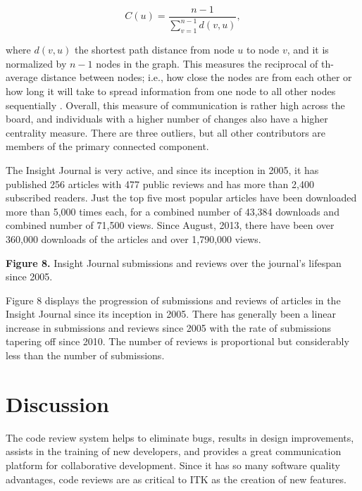 \documentclass{frontiersENG} %
\begin{document}
\begin{equation}
   C(u) = \frac{n - 1}{\sum_{v=1}^{n-1} d(v, u)},
\end{equation}

where $d(v, u)$ the shortest path distance from node $u$ to node $v$, and it
is normalized by $n-1$ nodes in the graph. This measures the reciprocal of th-
average distance between nodes; i.e., how close the nodes are from each other
or how long it will take to spread information from one node to all other
nodes sequentially \cite{Newman2005}. Overall, this measure of communication is
rather high across the board, and individuals with a higher
number of changes also have a higher centrality measure.  There are three
outliers, but all other contributors are members of the primary connected
component.


%
%
%
The Insight Journal is very active, and since its inception in 2005, it has published
256 articles with 477 public reviews and has more than 2,400 subscribed
readers. Just the top five most popular articles have been downloaded more than
5,000 times each, for a combined number of 43,384 downloads and combined number
of 71,500 views. Since August, 2013, there have been over 360,000 downloads of
the articles and over 1,790,000 views.

\textbf{Figure 8. }{Insight Journal submissions and reviews over the journal's
lifespan since 2005.} \label{fig:08}

Figure 8 displays the progression of submissions and reviews of articles in the
Insight Journal since its inception in 2005.  There has generally been a linear
increase in submissions and reviews since 2005 with the rate of submissions
tapering off since 2010.  The number of reviews is proportional but
considerably less than the number of submissions.



\section{Discussion}
The code review system helps to eliminate bugs, results in design improvements,
assists in the training of new developers, and provides a great communication
platform for collaborative development. Since it has so many software quality
advantages, code reviews are as critical to ITK as the creation of new features.
\end{document}
